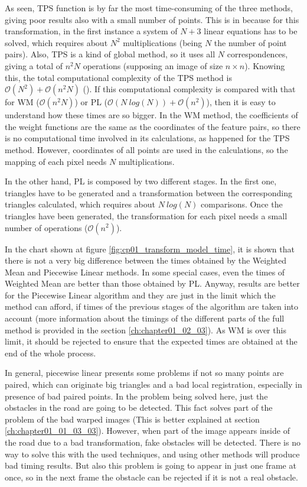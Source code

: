 As seen, \ac{TPS} function is by far the most time-consuming of the three methods, giving poor results also with a small number of points. This is in because for this transformation, in the first instance a system of $N + 3$ linear equations has to be solved, which requires about $N^2$ multiplications (being $N$ the number of point pairs). Also, TPS is a kind of global method, so it uses all $N$ correspondences, giving a total of $n^2N$ operations (supposing an image of size $n \times n$). Knowing this, the total computational complexity of the TPS method is $\mathcal{O}(N^2) + \mathcal{O}(n^2N)$ (\cite{zagorchev2006comparative}). If this computational complexity is compared with that for \ac{WM} ($\mathcal{O}(n^2N)$) or \ac{PL} ($\mathcal{O}(N~log(N)) + \mathcal{O}(n^2)$), then it is easy to understand how these times are so bigger. In the \acf{WM} method, the coefficients of the weight functions are the same as the coordinates of the feature pairs, so there is no computational time involved in its calculations, as happened for the \ac{TPS} method. However, coordinates of all points are used in the calculations, so the mapping of each pixel needs $N$ multiplications.

In the other hand, \acf{PL} is composed by two different stages. In the first one, triangles have to be generated and a transformation between the corresponding triangles calculated, which requires about $N~log(N)$ comparisons. Once the triangles have been generated, the transformation for each pixel needs a small number of operations ($\mathcal{O}(n^2)$).

In the chart shown at figure \ref{fig:cp01_transform_model_time}, it is shown that there is not a very big difference between the times obtained by the Weighted Mean and Piecewise Linear methods. In some special cases, even the times of Weighted Mean are better than those obtained by \ac{PL}. Anyway, results are better for the Piecewise Linear algorithm and they are just in the limit which the method can afford, if times of the previous stages of the algorithm are taken into account (more information about the timings of the different parts of the full method is provided in the section \ref{ch:chapter01_02_03}). As \ac{WM} is over this limit, it should be rejected to ensure that the expected times are obtained at the end of the whole process.

In general, piecewise linear presents some problems if not so many points are paired, which can originate big triangles and a bad local registration, especially in presence of bad paired points. In the problem being solved here, just the obstacles in the road are going to be detected. This fact solves part of the problem of the bad warped images (This is better explained at section \ref{ch:chapter01_01_03_03}). However, when part of the image appears inside of the road due to a bad transformation, fake obstacles will be detected. There is no way to solve this with the used techniques, and using other methods will produce bad timing results. But also this problem is going to appear in just one frame at once, so in the next frame the obstacle can be rejected if it is not a real obstacle.

